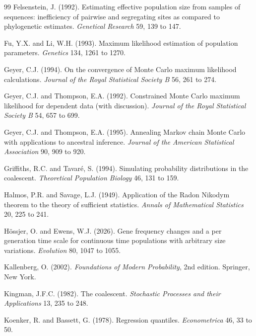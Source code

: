 \begin{thebibliography}{99}
Felsenstein, J. (1992). Estimating effective population size from samples of sequences:
inefficiency of pairwise and segregating sites as compared to phylogenetic estimates.
\emph{Genetical Research} 59, 139 to 147.

Fu, Y.X. and Li, W.H. (1993). Maximum likelihood estimation of population parameters.
\emph{Genetics} 134, 1261 to 1270.

Geyer, C.J. (1994). On the convergence of Monte Carlo maximum likelihood calculations.
\emph{Journal of the Royal Statistical Society B} 56, 261 to 274.

Geyer, C.J. and Thompson, E.A. (1992). Constrained Monte Carlo maximum likelihood for
dependent data (with discussion). \emph{Journal of the Royal Statistical Society B} 54,
657 to 699.

Geyer, C.J. and Thompson, E.A. (1995). Annealing Markov chain Monte Carlo with applications to
ancestral inference. \emph{Journal of the American Statistical Association} 90, 909 to 920.

Griffiths, R.C. and Tavar\'e, S. (1994). Simulating probability distributions in the
coalescent. \emph{Theoretical Population Biology} 46, 131 to 159.

Halmos, P.R. and Savage, L.J. (1949). Application of the Radon Nikodym theorem to the theory
of sufficient statistics. \emph{Annals of Mathematical Statistics} 20, 225 to 241.

H\"ossjer, O. and Ewens, W.J. (2026). Gene frequency changes and a per generation time scale
for continuous time populations with arbitrary size variations. \emph{Evolution} 80, 1047 to 1055.

Kallenberg, O. (2002). \emph{Foundations of Modern Probability}, 2nd edition. Springer, New
York.

Kingman, J.F.C. (1982). The coalescent. \emph{Stochastic Processes and their Applications} 13,
235 to 248.

Koenker, R. and Bassett, G. (1978). Regression quantiles. \emph{Econometrica} 46, 33 to 50.


\end{thebibliography}
